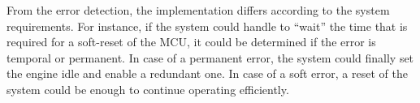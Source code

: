 From the error detection, the implementation differs according to the system requirements. For instance, if the system could handle to “wait” the time that is required for a
soft-reset of the MCU, it could be determined if the error is temporal or permanent.
In case of a permanent error, the system could finally set the engine idle and enable
a redundant one. In case of a soft error, a reset of the system could be enough to
continue operating efficiently.



